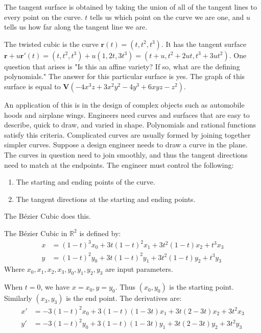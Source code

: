 \documentclass[../main.tex]{subfiles}
\begin{document}
%
\begin{remark}
The tangent surface is obtained by taking the union of all of the tangent lines to every point on the curve. $t$ tells us which point on the curve we are one, and $u$ tells us how far along the tangent line we are.
\end{remark}
%
\begin{example}
The twisted cubic is the curve $\mathbf{r}(t) = (t,t^2,t^3)$. It has the tangent surface $\mathbf{r}+u\mathbf{r}'(t)=(t,t^2,t^3)+u(1,2t,3t^3) = (t+u,t^2+2ut,t^3+3ut^2)$. One question that arises is "Is this an affine variety? If so, what are the defining polynomials." The answer for this particular surface is yes. The graph of this surface is equal to $\mathbf{V}(-4x^3z+3x^2y^2-4y^3+6xyz-z^2)$.
\end{example}
%
An application of this is in the design of complex objects such as automobile hoods and airplane wings. Engineers need curves and surfaces that are easy to describe, quick to draw, and varied in shape. Polynomials and rational functions satisfy this criteria. Complicated curves are usually formed by joining together simpler curves. Suppose a design engineer needs to draw a curve in the plane. The curves in question need to join smoothly, and thus the tangent directions need to match at the endpoints. The engineer must control the following:
%
\begin{enumerate}
\item The starting and ending points of the curve.
\item The tangent directions at the starting and ending points.
\end{enumerate}
%
The B\'{e}zier Cubic does this.
%
\begin{definition}
The B\'{e}zier Cubic in $\mathbb{R}^2$ is defined by:
\begin{align}
x &= (1-t)^3 x_0+3t(1-t)^2x_1+3t^2(1-t)x_2+t^3x_3 \\
y &= (1-t)^2 y_0+3t(1-t)^2y_1+3t^2(1-t)y_2+t^3y_3
\end{align}
Where $x_0,x_1,x_2,x_3,y_0,y_1,y_2,y_3$ are input parameters.
\end{definition}
%
When $t=0$, we have $x = x_0, y=y_0$. Thus $(x_0,y_0)$ is the starting point. Similarly $(x_3,y_3)$ is the end point. The derivatives are:
\begin{align}
x' &= -3(1-t)^2x_0 + 3(1-t)(1-3t)x_1+3t(2-3t)x_2+3t^2x_3 \\
y' &= -3(1-t)^2y_0 + 3(1-t)(1-3t)y_1+3t(2-3t)y_2+3t^2y_3
\end{align}
\end{document}
